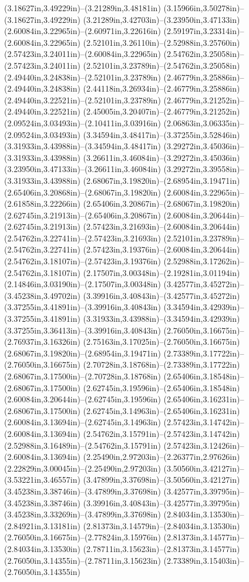 (3.18627in,3.49229in)--(3.21289in,3.48181in) (3.15966in,3.50278in)--(3.18627in,3.49229in) (3.21289in,3.42703in)--(3.23950in,3.47133in) (2.60084in,3.22965in)--(2.60971in,3.22616in) (2.59197in,3.23314in)--(2.60084in,3.22965in) (2.52101in,3.26110in)--(2.52988in,3.25760in) (2.57423in,3.24011in)--(2.60084in,3.22965in) (2.54762in,3.25058in)--(2.57423in,3.24011in) (2.52101in,3.23789in)--(2.54762in,3.25058in) (2.49440in,3.24838in)--(2.52101in,3.23789in) (2.46779in,3.25886in)--(2.49440in,3.24838in) (2.44118in,3.26934in)--(2.46779in,3.25886in) (2.49440in,3.22521in)--(2.52101in,3.23789in) (2.46779in,3.21252in)--(2.49440in,3.22521in) (2.45005in,3.20407in)--(2.46779in,3.21252in) (2.09524in,3.03493in)--(2.10411in,3.03916in) (2.06863in,3.06335in)--(2.09524in,3.03493in) (3.34594in,3.48417in)--(3.37255in,3.52846in) (3.31933in,3.43988in)--(3.34594in,3.48417in) (3.29272in,3.45036in)--(3.31933in,3.43988in) (3.26611in,3.46084in)--(3.29272in,3.45036in) (3.23950in,3.47133in)--(3.26611in,3.46084in) (3.29272in,3.39558in)--(3.31933in,3.43988in) (2.68067in,3.19820in)--(2.68954in,3.19471in) (2.65406in,3.20868in)--(2.68067in,3.19820in) (2.60084in,3.22965in)--(2.61858in,3.22266in) (2.65406in,3.20867in)--(2.68067in,3.19820in) (2.62745in,3.21913in)--(2.65406in,3.20867in) (2.60084in,3.20644in)--(2.62745in,3.21913in) (2.57423in,3.21693in)--(2.60084in,3.20644in) (2.54762in,3.22741in)--(2.57423in,3.21693in) (2.52101in,3.23789in)--(2.54762in,3.22741in) (2.57423in,3.19376in)--(2.60084in,3.20644in) (2.54762in,3.18107in)--(2.57423in,3.19376in) (2.52988in,3.17262in)--(2.54762in,3.18107in) (2.17507in,3.00348in)--(2.19281in,3.01194in) (2.14846in,3.03190in)--(2.17507in,3.00348in) (3.42577in,3.45272in)--(3.45238in,3.49702in) (3.39916in,3.40843in)--(3.42577in,3.45272in) (3.37255in,3.41891in)--(3.39916in,3.40843in) (3.34594in,3.42939in)--(3.37255in,3.41891in) (3.31933in,3.43988in)--(3.34594in,3.42939in) (3.37255in,3.36413in)--(3.39916in,3.40843in) (2.76050in,3.16675in)--(2.76937in,3.16326in) (2.75163in,3.17025in)--(2.76050in,3.16675in) (2.68067in,3.19820in)--(2.68954in,3.19471in) (2.73389in,3.17722in)--(2.76050in,3.16675in) (2.70728in,3.18768in)--(2.73389in,3.17722in) (2.68067in,3.17500in)--(2.70728in,3.18768in) (2.65406in,3.18548in)--(2.68067in,3.17500in) (2.62745in,3.19596in)--(2.65406in,3.18548in) (2.60084in,3.20644in)--(2.62745in,3.19596in) (2.65406in,3.16231in)--(2.68067in,3.17500in) (2.62745in,3.14963in)--(2.65406in,3.16231in) (2.60084in,3.13694in)--(2.62745in,3.14963in) (2.57423in,3.14742in)--(2.60084in,3.13694in) (2.54762in,3.15791in)--(2.57423in,3.14742in) (2.52988in,3.16489in)--(2.54762in,3.15791in) (2.57423in,3.12426in)--(2.60084in,3.13694in) (2.25490in,2.97203in)--(2.26377in,2.97626in) (2.22829in,3.00045in)--(2.25490in,2.97203in) (3.50560in,3.42127in)--(3.53221in,3.46557in) (3.47899in,3.37698in)--(3.50560in,3.42127in) (3.45238in,3.38746in)--(3.47899in,3.37698in) (3.42577in,3.39795in)--(3.45238in,3.38746in) (3.39916in,3.40843in)--(3.42577in,3.39795in) (3.45238in,3.33269in)--(3.47899in,3.37698in) (2.84034in,3.13530in)--(2.84921in,3.13181in) (2.81373in,3.14579in)--(2.84034in,3.13530in) (2.76050in,3.16675in)--(2.77824in,3.15976in) (2.81373in,3.14577in)--(2.84034in,3.13530in) (2.78711in,3.15623in)--(2.81373in,3.14577in) (2.76050in,3.14355in)--(2.78711in,3.15623in) (2.73389in,3.15403in)--(2.76050in,3.14355in) 
